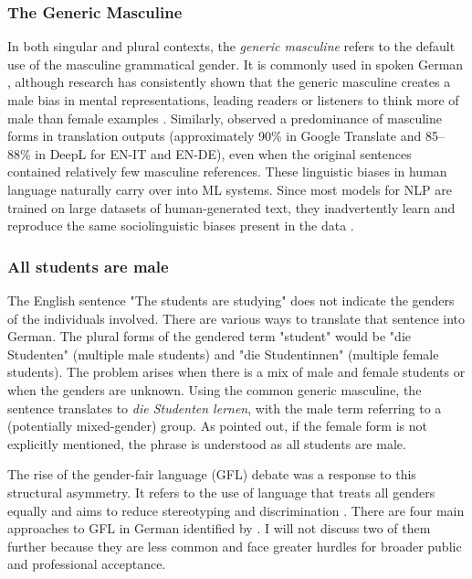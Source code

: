 \subsubsection{The Generic Masculine} \label{subsection:generic_masculine}
In both singular and plural contexts, the \textit{generic masculine} refers to the default use of the masculine grammatical gender. It is commonly used in spoken German \citep{lardelliBuildingBridgesDataset2024,schmitzGermanAllProfessors2022}, although research has consistently shown that the generic masculine creates a male bias in mental representations, leading readers or listeners to think more of male than female examples \citep{sczesnyCanGenderFairLanguage2016}. Similarly, \citet{rescignoGenderBiasMachine2023} observed a predominance of masculine forms in translation outputs (approximately 90\% in Google Translate and 85–88\% in DeepL for EN-IT and EN-DE), even when the original sentences contained relatively few masculine references. These linguistic biases in human language naturally carry over into ML systems. Since most models for NLP are trained on large datasets of human-generated text, they inadvertently learn and reproduce the same sociolinguistic biases present in the data \citep{choMeasuringGenderBias2019}.

\subsubsection{All students are male}
The English sentence "The students are studying" does not indicate the genders of the individuals involved. There are various ways to translate that sentence into German. The plural forms of the gendered term "student" would be "die Studenten" (multiple male students) and "die Studentinnen" (multiple female students). The problem arises when there is a mix of male and female students or when the genders are unknown. 
Using the common generic masculine, the sentence translates to \textit{die Studenten lernen}, with the male term referring to a (potentially mixed-gender) group. As \citet{schmitzGermanAllProfessors2022} pointed out, if the female form is not explicitly mentioned, the phrase is understood as all students are male.

The rise of the gender-fair language (GFL) debate was a response to this structural asymmetry. It refers to the use of language that treats all genders equally and aims to reduce stereotyping and discrimination \citep{sczesnyCanGenderFairLanguage2016}. 
There are four main approaches to GFL in German identified by \citet{lardelliBuildingBridgesDataset2024}. I will not discuss two of them further because they are less common and face greater hurdles for broader public and professional acceptance.

